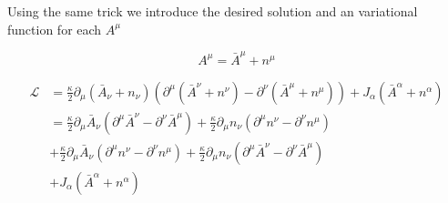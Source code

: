 \documentclass{article}
\newcommand{\LL}[0]{\mathcal{L}}
\newcommand{\spacegrad}[0]{\boldsymbol{\nabla}}
\newcommand{\barA}[0]{\bar{A}}
\begin{document}

Using the same trick we introduce the desired solution and an variational function for each $A^{\mu}$

\begin{equation*}
A^{\mu} = \barA^{\mu} + n^{\mu}
\end{equation*}

\begin{align*}
\LL 
&= \frac{\kappa}{2} \partial_{\mu} (\barA_{\nu} + n_{\nu}) ( \partial^{\mu} (\barA^{\nu} + n^{\nu}) - \partial^{\nu} (\barA^{\mu} + n^{\mu}) ) + J_{\alpha} (\barA^{\alpha} + n^{\alpha}) \\
&= \frac{\kappa}{2} \partial_{\mu} \barA_{\nu} ( \partial^{\mu} \barA^{\nu} - \partial^{\nu} \barA^{\mu} ) + \frac{\kappa}{2} \partial_{\mu} n_{\nu} ( \partial^{\mu} n^{\nu} - \partial^{\nu} n^{\mu} )  \\
&+ \frac{\kappa}{2} \partial_{\mu} \barA_{\nu} ( \partial^{\mu} n^{\nu} - \partial^{\nu} n^{\mu} ) + \frac{\kappa}{2} \partial_{\mu} n_{\nu} ( \partial^{\mu} \barA^{\nu} - \partial^{\nu} \barA^{\mu} )  \\
&+ J_{\alpha} (\barA^{\alpha} + n^{\alpha}) \\
\end{align*}
\end{document}
